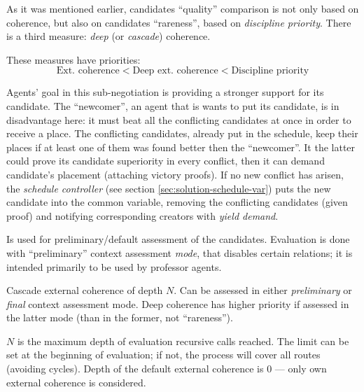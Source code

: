 \documentclass[../../ThesisDoc]{subfiles}
\begin{document}
As it was mentioned earlier, candidates ``quality'' comparison is not only based
on coherence, but also on candidates ``rareness'', based on \emph{discipline priority}.
There is a third measure: \emph{deep} (or \emph{cascade}) coherence.

\medskip
\noindent
These measures have priorities:
$$ \text{Ext. coherence} < \text{Deep ext. coherence} < \text{Discipline priority} $$

\medskip
\noindent
Agents' goal in this sub-negotiation is providing a stronger support for its
candidate. The ``newcomer'', an agent that is wants to put its candidate, is
in disadvantage here: it must beat all the conflicting candidates at once in
order to receive a place. The conflicting candidates, already put in the schedule,
keep their places if at least one of them was found better then the ``newcomer''.
It the latter could prove its candidate superiority in every conflict, then
it can demand candidate's placement (attaching victory proofs).
If no new conflict has arisen, the \emph{schedule controller}
(see section \ref{sec:solution-schedule-var}) puts the new candidate into the
common variable, removing the conflicting candidates (given proof) and notifying
corresponding creators with \emph{yield demand}.



Is used for preliminary/default assessment of the candidates.
Evaluation is done with ``preliminary'' context assessment \emph{mode}, that
disables certain relations; it is intended primarily to be used by professor agents.


Cascade external coherence of depth $N$. Can be assessed in either \emph{preliminary}
or \emph{final} context assessment mode. Deep coherence has higher priority if
assessed in the latter mode (than in the former, not ``rareness'').

$N$ is the maximum depth of evaluation recursive calls reached. The limit can
be set at the beginning of evaluation; if not, the process will cover all
 routes (avoiding cycles).
Depth of the default external coherence is 0 --- only own external coherence is
considered.
\end{document}
